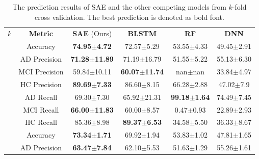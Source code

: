 \begin{table}[h]\label{tab: experimetal results}
    \small
    \setlength{\tabcolsep}{4pt} %
    \centering
    \caption{The prediction results of SAE and the other competing models from $k$-fold cross validation. The best prediction is denoted as bold font.}\label{tab: prediction RMSE}
    \begin{tabular}{|c|c|c|c|c|c|} %
    \hline
    {\bfseries $k$} & {\bfseries Metric} & \multicolumn{1}{c}{{\bfseries SAE} (Ours)} & \multicolumn{1}{c}{{\bfseries BLSTM}} & \multicolumn{1}{c}{{\bfseries RF}} & {\bfseries DNN}\\ %
    \Xhline{1pt}
    \multirow{7}{*}{5} %
    & Accuracy & \multicolumn{1}{c}{{\bfseries 74.95$\pm$4.72}} & \multicolumn{1}{c}{72.57$\pm$5.29} & \multicolumn{1}{c}{53.55$\pm$4.33} & 49.45$\pm$2.91\\
    & AD Precision & \multicolumn{1}{c}{{\bfseries 71.28$\pm$11.89}} & \multicolumn{1}{c}{71.19$\pm$16.79} & \multicolumn{1}{c}{51.55$\pm$5.22} & 55.13$\pm$6.30\\
    & MCI Precision & \multicolumn{1}{c}{59.84$\pm$10.11} & \multicolumn{1}{c}{{\bfseries 60.07$\pm$11.74}} & \multicolumn{1}{c}{nan$\pm$nan} & 33.84$\pm$4.97\\
    & HC Precision & \multicolumn{1}{c}{{\bfseries 89.69$\pm$7.33}} & \multicolumn{1}{c}{86.60$\pm$8.15} & \multicolumn{1}{c}{66.28$\pm$2.88} & 47.02$\pm$7.9\\
    & AD Recall & \multicolumn{1}{c}{69.30$\pm$7.30} & \multicolumn{1}{c}{65.92$\pm$21.31} & \multicolumn{1}{c}{{\bfseries 99.18$\pm$1.64}} & 74.49$\pm$7.45\\
    & MCI Recall & \multicolumn{1}{c}{{\bfseries 66.00$\pm$11.83}} & \multicolumn{1}{c}{60.00$\pm$8.57} & \multicolumn{1}{c}{0.47$\pm$0.93} & 22.89$\pm$2.93\\
    & HC Recall & \multicolumn{1}{c}{85.36$\pm$8.98} & \multicolumn{1}{c}{{\bfseries 89.37$\pm$6.53}} & \multicolumn{1}{c}{34.58$\pm$5.50} & 36.33$\pm$8.67\\
    \Xhline{1pt}
    \multirow{7}{*}{3} %
    & Accuracy & \multicolumn{1}{c}{{\bfseries 73.34$\pm$1.71}} & \multicolumn{1}{c}{69.92$\pm$1.94} & \multicolumn{1}{c}{53.83$\pm$1.02} & 47.81$\pm$1.65\\
    & AD Precision & \multicolumn{1}{c}{{\bfseries 63.47$\pm$7.84}} & \multicolumn{1}{c}{62.10$\pm$5.53} & \multicolumn{1}{c}{51.63$\pm$1.29} & 55.26$\pm$1.61\\

\end{tabular}
\end{table}

